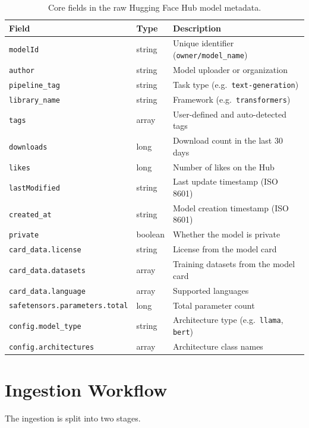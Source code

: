 \documentclass[11pt]{article}
\begin{document}
\begin{table}[H]
\centering
\begin{tabular}{lll}
\toprule
\textbf{Field} & \textbf{Type} & \textbf{Description} \\
\midrule
\texttt{modelId}       & string  & Unique identifier (\texttt{owner/model\_name}) \\
\texttt{author}        & string  & Model uploader or organization \\
\texttt{pipeline\_tag} & string  & Task type (e.g.\ \texttt{text-generation}) \\
\texttt{library\_name} & string  & Framework (e.g.\ \texttt{transformers}) \\
\texttt{tags}          & array   & User-defined and auto-detected tags \\
\texttt{downloads}     & long    & Download count in the last 30 days \\
\texttt{likes}         & long    & Number of likes on the Hub \\
\texttt{lastModified}  & string  & Last update timestamp (ISO 8601) \\
\texttt{created\_at}   & string  & Model creation timestamp (ISO 8601) \\
\texttt{private}       & boolean & Whether the model is private \\
\texttt{card\_data.license}  & string & License from the model card \\
\texttt{card\_data.datasets} & array  & Training datasets from the model card \\
\texttt{card\_data.language} & array  & Supported languages \\
\texttt{safetensors.parameters.total} & long & Total parameter count \\
\texttt{config.model\_type} & string & Architecture type (e.g.\ \texttt{llama}, \texttt{bert}) \\
\texttt{config.architectures} & array & Architecture class names \\
\bottomrule
\end{tabular}
\caption{Core fields in the raw Hugging Face Hub model metadata.}
\end{table}

\section{Ingestion Workflow}

The ingestion is split into two stages.
\end{document}
